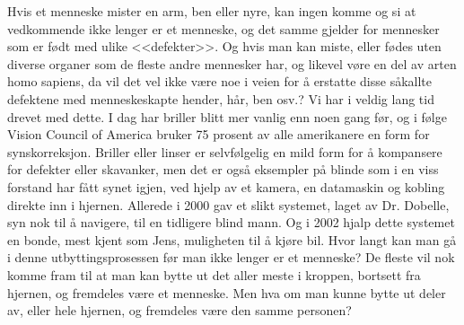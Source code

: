 Hvis et menneske mister en arm, ben eller nyre, kan ingen komme og si at vedkommende ikke lenger er et menneske, og det samme gjelder for mennesker som er født med ulike <<defekter>>. Og hvis man kan miste, eller fødes uten diverse organer som de fleste andre mennesker har, og likevel vøre en del av arten homo sapiens, da vil det vel ikke være noe i veien for å erstatte disse såkallte defektene med menneskeskapte hender, hår, ben osv.? Vi har i veldig lang tid drevet med dette. I dag har briller blitt mer vanlig enn noen gang før, og i følge Vision Council of America bruker 75 prosent av alle amerikanere en form for synskorreksjon. Briller eller linser er selvfølgelig en mild form for å kompansere for defekter eller skavanker, men det er også eksempler på blinde som i en viss forstand har fått synet igjen, ved hjelp av et kamera, en datamaskin og kobling direkte inn i hjernen. Allerede i 2000 gav et slikt systemet, laget av Dr. Dobelle, syn nok til å navigere, til en tidligere blind mann. Og i 2002 hjalp dette systemet en bonde, mest kjent som Jens, muligheten til å kjøre bil.
Hvor langt kan man gå i denne utbyttingsprosessen før man ikke lenger er et menneske?
De fleste vil nok komme fram til at man kan bytte ut det aller meste i kroppen, bortsett fra hjernen, og fremdeles være et menneske. Men hva om man kunne bytte ut deler av, eller hele hjernen, og fremdeles være den samme personen? 
